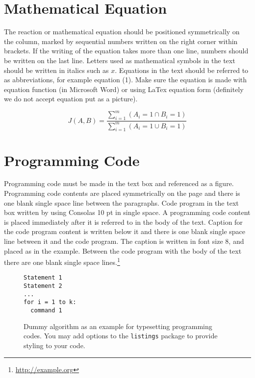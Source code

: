 \documentclass[conference, compsoc, twoside]{IEEEtran}
\begin{document}
\section{Mathematical Equation}
The reaction or mathematical equation should be positioned symmetrically on the column, marked by sequential numbers written on the right corner within brackets. If the writing of the equation takes more than one line, numbers should be written on the last line. Letters used as mathematical symbols in the text should be written in italics such as $x$. Equations in the text should be referred to as abbreviations, for example equation (1). Make sure the equation is made with equation function (in Microsoft Word) or using LaTex equation form (definitely we do not accept equation put as a picture).

\begin{equation}
J(A,B) = \frac{\sum_{i=1}^{m} (A_{i}=1 \cap B_{i}=1)}{\sum_{i=1}^{m} (A_{i}=1 \cup B_{i}=1)}
\label{eq:jaccard}
\end{equation}

\section{Programming Code}
Programming code must be made in the text box and referenced as a figure. Programming code contents are placed symmetrically on the page and there is one blank single space line between the paragraphs. Code program in the text box written by using Consolas 10 pt  in single space. A programming code content is placed immediately after it is referred to in the body of the text. Caption for the code program content is written below it and there is one blank single space line between it and the code program. The caption is written in font size 8, and placed as in the example. Between the code program with the body of the text there are one blank single space lines.\footnote{\url{http://example.org}}

\begin{figure}[h]
    \centering
\begin{lstlisting}[frame=single]
Statement 1
Statement 2
...
for i = 1 to k:
  command 1
\end{lstlisting}
\caption{Dummy algorithm as an example for typesetting programming codes. You may add options to the \texttt{listings} package to provide styling to your code.}
    \label{fig:code}
\end{figure}
\end{document}
